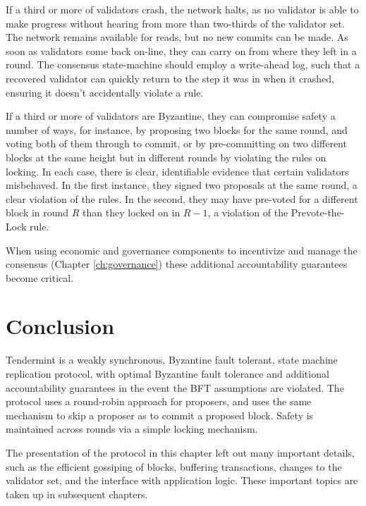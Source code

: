 If a third or more of validators crash, the network halts, 
as no validator is able to make progress without hearing from more than two-thirds of the validator set.
The network remains available for reads, but no new commits can be made.
As soon as validators come back on-line, they can carry on from where they left in a round. 
The consensus state-machine should employ a write-ahead log,
such that a recovered validator can quickly return to the step it was in when it crashed,
ensuring it doesn't accidentally violate a rule.

If a third or more of validators are Byzantine, they can compromise safety a number of ways, 
for instance, by proposing two blocks for the same round, and voting both of them through to commit, 
or by pre-committing on two different blocks at the same height but in 
different rounds by violating the rules on locking.
In each case, there is clear, identifiable evidence that certain validators misbehaved. 
In the first instance, they signed two proposals at the same round, a clear violation of the rules.
In the second, they may have pre-voted for a different block in round $R$ than they locked on in $R-1$, 
a violation of the Prevote-the-Lock rule.

When using economic and governance components to incentivize 
and manage the consensus (Chapter  \ref{ch:governance})
these additional accountability guarantees become critical.

\section{Conclusion}

Tendermint is a weakly synchronous, Byzantine fault tolerant, state machine replication protocol,
with optimal Byzantine fault tolerance and additional accountability guarantees in the event
the BFT assumptions are violated. 
The protocol uses a round-robin approach for proposers, and uses the same mechanism to skip a proposer as to commit a proposed block.
Safety is maintained across rounds via a simple locking mechanism.

The presentation of the protocol in this chapter left out many important details, 
such as the efficient gossiping of blocks, buffering transactions, changes to the validator set, 
and the interface with application logic. These important topics are taken up in subsequent chapters.


